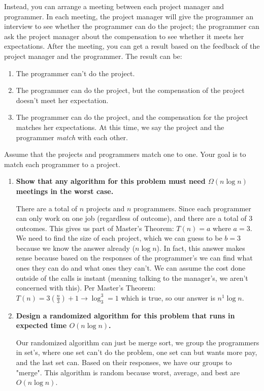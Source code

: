 \documentclass[11pt]{article}
\begin{document}
Instead, you can arrange a meeting between each project manager and
programmer.  In each meeting, the project manager will give the
programmer an interview to see whether the programmer can do the
project; the programmer can ask the project manager about the
compensation to see whether it meets her expectations.  After the
meeting, you can get a result based on the feedback of the project
manager and the programmer.  The result can be:

\begin{enumerate}
  \item The programmer can't do the project.
  \item The programmer can do the project, but the compensation of the
    project doesn't meet her expectation.
  \item The programmer can do the project, and the compensation for
    the project matches her expectations. At this time, we say the
    project and the programmer \textit{match} with each other.
\end{enumerate}

Assume that the projects and programmers match one to one. Your goal
is to match each programmer to a project.

\begin{enumerate}[label=\Alph*.]
\item \textbf{ Show that any algorithm for this problem must need $\Omega( n
\log{n} )$ meetings in the worst case.}

There are a total of $n$ projects and $n$ programmers. Since each programmer can only work on one job (regardless of outcome), and there are a total of $3$ outcomes. This gives us part of Master's Theorem: $T(n) = a$ where $a = 3$. We need to find the size of each project, which we can guess to be $b = 3$ because we know the answer already ($n \log n$). In fact, this answer makes sense because based on the responses of the programmer's we can find what ones they can do and what ones they can't. We can assume the cost done outside of the calls is instant (meaning talking to the manager's, we aren't concerned with this). Per Master's Theorem: $T(n) = 3(\frac{n}{3}) + 1 \to \log_3^3 = 1$ which is true, so our answer is $n^1 \log n$.

\item  \textbf{Design a randomized algorithm for this problem that runs in
expected time $O ( n \log{n} )$.}

Our randomized algorithm can just be merge sort, we group the programmers in set's, where one set can't do the problem, one set can but wants more pay, and the last set can. Based on their responses, we have our groups to "merge". This algorithm is random because worst, average, and best are $O(n \log n)$.
\end{enumerate}
\end{document}

